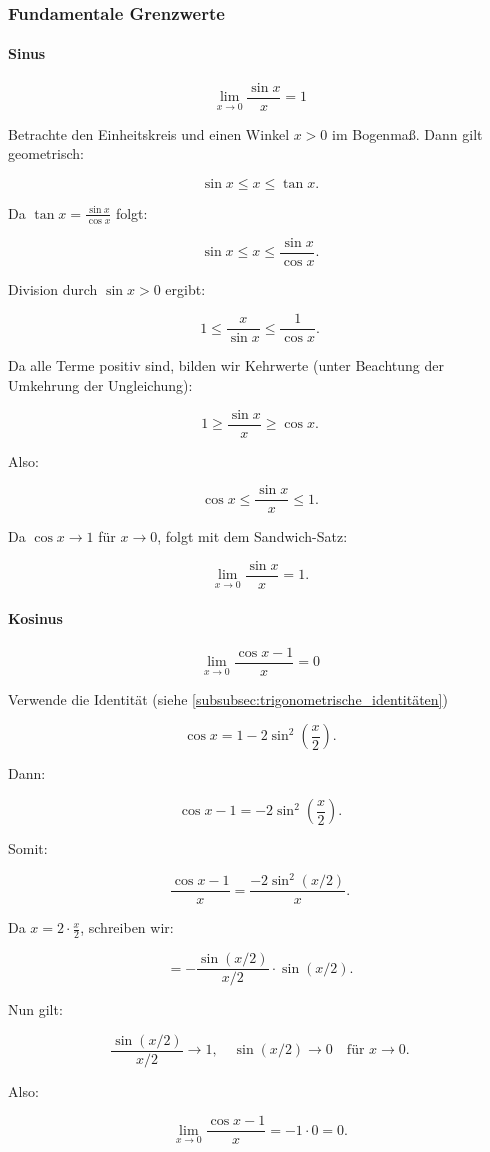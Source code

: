 \documentclass[../zusammenfassung_AN.tex]{subfiles}
\begin{document}
\subsubsection{Fundamentale Grenzwerte}
\paragraph{Sinus}
$$
\lim_{x\to 0} \frac{\sin x}{x} = 1
$$

Betrachte den Einheitskreis und einen Winkel $x>0$ im Bogenmaß.
Dann gilt geometrisch:

$$
\sin x \le x \le \tan x.
$$

Da $\tan x = \frac{\sin x}{\cos x}$ folgt:

$$
\sin x \le x \le \frac{\sin x}{\cos x}.
$$

Division durch $\sin x > 0$ ergibt:

$$
1 \le \frac{x}{\sin x} \le \frac{1}{\cos x}.
$$

Da alle Terme positiv sind, bilden wir Kehrwerte
(unter Beachtung der Umkehrung der Ungleichung):

$$
1 \ge \frac{\sin x}{x} \ge \cos x.
$$

Also:

$$
\cos x \le \frac{\sin x}{x} \le 1.
$$

Da $\cos x \to 1$ für $x \to 0$,
folgt mit dem Sandwich-Satz:

$$
\lim_{x\to 0} \frac{\sin x}{x} = 1.
$$

\paragraph{Kosinus}
$$
\lim_{x\to 0} \frac{\cos x - 1}{x} = 0
$$

Verwende die Identität (siehe \autoref{subsubsec:trigonometrische_identitäten})

$$
\cos x = 1 - 2\sin^2\left(\frac{x}{2}\right).
$$

Dann:

$$
\cos x - 1
=
-2\sin^2\left(\frac{x}{2}\right).
$$

Somit:

$$
\frac{\cos x - 1}{x}
=
\frac{-2\sin^2(x/2)}{x}.
$$

Da $x = 2 \cdot \frac{x}{2}$, schreiben wir:

$$
=
-
\frac{\sin(x/2)}{x/2}
\cdot
\sin(x/2).
$$

Nun gilt:

$$
\frac{\sin(x/2)}{x/2} \to 1,
\quad
\sin(x/2) \to 0
\quad
\text{für } x \to 0.
$$

Also:

$$
\lim_{x\to 0} \frac{\cos x - 1}{x}
=
-1 \cdot 0
=
0.
$$
\end{document}
